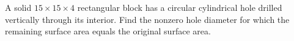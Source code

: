 A solid $15\times15\times4$ rectangular block has a circular cylindrical hole drilled vertically through its interior. Find the nonzero hole diameter for which the remaining surface area equals the original surface area.
